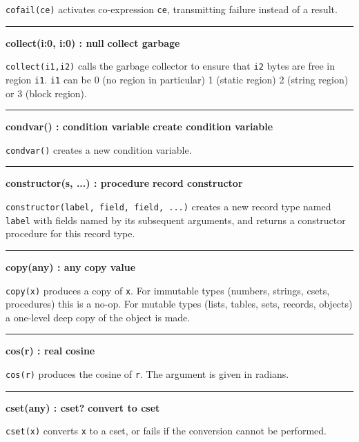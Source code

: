 \noindent
{}\texttt{cofail(ce)} activates
co-expression \texttt{ce}, transmitting failure instead of a result.

\bigskip
\hrule\vspace{0.1cm}
\noindent
{\bf collect(i:0, i:0) : null } \hfill {\bf collect garbage}

\noindent
{}\texttt{collect(i1,i2)} calls the
garbage collector to ensure that \texttt{i2} bytes
are free in region \texttt{i1}. \texttt{i1} can be 0 (no region in particular)
1 (static region) 2 (string region) or 3 (block region).

\bigskip
\hrule\vspace{0.1cm}
\noindent
{\bf condvar() : condition variable } \hfill {\bf create condition variable}

\noindent
{}\texttt{condvar()} creates
a new condition variable.

\bigskip
\hrule\vspace{0.1cm}
\noindent
{\bf constructor(s, ...) : procedure } \hfill {\bf record constructor}

\noindent
{}\texttt{constructor(label, field, field, ...)}
creates a new record type named \texttt{label} with fields named by its
subsequent arguments, and returns a constructor procedure for this
record type.

\bigskip
\hrule\vspace{0.1cm}
\noindent
{\bf copy(any) : any } \hfill {\bf copy value}\WarningNotThreadSafe

\noindent
{}\texttt{copy(x)} produces a copy of \texttt{x}. For immutable
types (numbers, strings, csets, procedures) this is a no-op. For mutable
types (lists, tables, sets, records, objects) a one-level deep copy of
the object is made.

\bigskip\hrule\vspace{0.1cm}
\noindent
{\bf cos(r) : real } \hfill {\bf cosine}

\noindent
{}\texttt{cos(r)} produces the cosine of \texttt{r}. The argument
is given in radians.

\bigskip\hrule\vspace{0.1cm}
\noindent
{\bf cset(any) : cset? } \hfill {\bf convert to cset}

\noindent
{}\texttt{cset(x)} converts \texttt{x} to a cset,
or fails if the conversion cannot be performed.

